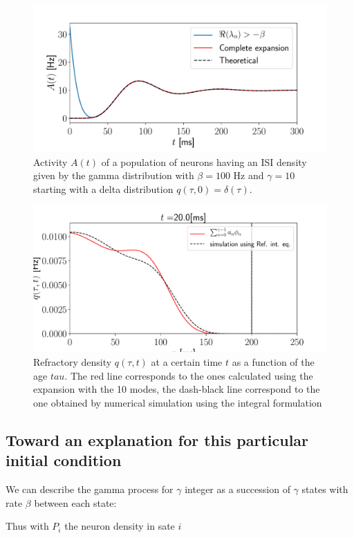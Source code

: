 \documentclass[a4paper,12pt,twoside]{article}
\begin{document}
\begin{figure}[h!]
	\centering
	\includegraphics[width=0.8\linewidth]{expan.pdf}
	\caption{Activity $A(t)$ of a population of neurons having an ISI density given by the gamma distribution with $\beta=100$ Hz and $\gamma=10$ starting with a delta distribution $q(\tau,0)=\delta(\tau)$. }
	\label{fig:expan}
\end{figure}
	
	


\begin{figure}[h!]
	\centering
	\includegraphics[width=0.8\linewidth]{q.pdf}
	\caption{Refractory density $q(\tau,t)$  at a certain time $t$ as a function of the age $tau$. The red line corresponds to the ones calculated using the expansion  with the 10 modes, the dash-black line correspond to the one obtained by numerical simulation using the integral formulation }
	\label{fig:q}
\end{figure}

\subsection{Toward an explanation for this particular initial condition}

We can describe the gamma process for $\gamma$ integer as a succession of $\gamma$ states with
rate $\beta$ between each state:

Thus with $P_i$ the neuron density  in sate $i$
\end{document}
